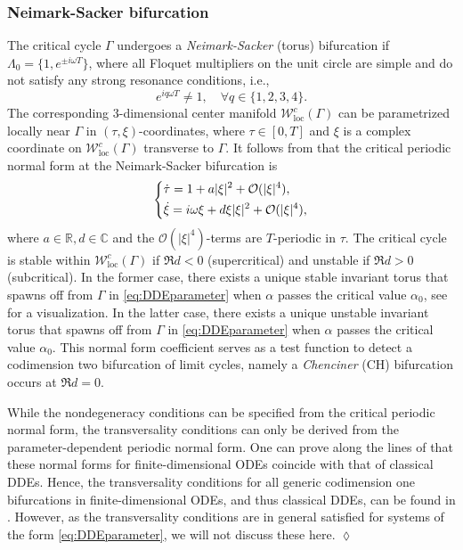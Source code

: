 \documentclass[english]{myarticle}
\DeclareMathOperator{\loc}{loc}
\begin{document}
\begin{sloppypar}
\subsubsection{Neimark-Sacker bifurcation}
The critical cycle $\Gamma$ undergoes a \emph{Neimark-Sacker} (torus) bifurcation if $\Lambda_0 = \{1,e^{\pm i \omega T}\}$, where all Floquet multipliers on the unit circle are simple and do not satisfy any strong resonance conditions, i.e.,
\begin{equation} \label{eq:resonances}
    e^{iq \omega T} \neq 1, \quad \forall q \in \{1,2,3,4\}.
\end{equation}
The corresponding $3$-dimensional center manifold $\mathcal{W}_{\loc}^{c}(\Gamma)$ can be parametrized locally near $\Gamma$ in $(\tau,\xi)$-coordinates, where $\tau \in [0,T]$ and $\xi$ is a complex coordinate on $\mathcal{W}_{\loc}^{c}(\Gamma)$ transverse to $\Gamma$. It follows from \cite[Theorem 24]{Article2} that the critical periodic normal form at the Neimark-Sacker bifurcation is 
\begin{equation} \label{eq:normal form NS}
    \begin{dcases}
    \dot{\tau} = 1 + a|\xi|^2 + \mathcal{O}(|\xi|^4),\\
    \dot{\xi} =  i \omega \xi + d\xi|\xi|^2 + \mathcal{O}(|\xi|^4),
    \end{dcases}
\end{equation}
where $a \in \mathbb{R}, d \in \mathbb{C}$ and the $\mathcal{O}(|\xi|^4)$-terms are $T$-periodic in $\tau$. The critical cycle is stable within $\mathcal{W}_{\loc}^{c}(\Gamma)$ if $\Re d < 0$ (supercritical) and unstable if $\Re d > 0$ (subcritical). In the former case, there exists a unique stable invariant torus that spawns off from $\Gamma$ in \eqref{eq:DDEparameter} when $\alpha$ passes the critical value $\alpha_0$, see \cite[Figure 5.22]{Kuznetsov2023a} for a visualization. In the latter case, there exists a unique unstable invariant torus that spawns off from $\Gamma$ in \eqref{eq:DDEparameter} when $\alpha$ passes the critical value $\alpha_0$. This normal form coefficient serves as a test function to detect a codimension two bifurcation of limit cycles, namely a \emph{Chenciner} (CH) bifurcation occurs at $ \Re d = 0$.

\begin{remark} \label{remark:parameterdependentCMT}
While the nondegeneracy conditions can be specified from the critical periodic normal form, the transversality conditions can only be derived from the parameter-dependent periodic normal form. One can prove along the lines of \cite{Article2} that these normal forms for finite-dimensional ODEs \cite[Theorem III.19]{Iooss1999} coincide with that of classical DDEs. Hence, the transversality conditions for all generic codimension one bifurcations in finite-dimensional ODEs, and thus classical DDEs, can be found in \cite[Section 5.6.2]{Kuznetsov2023a}. However, as the transversality conditions are in general satisfied for systems of the form \eqref{eq:DDEparameter}, we will not discuss these here. \hfill $\lozenge$
\end{remark}


\end{sloppypar}
\end{document}
